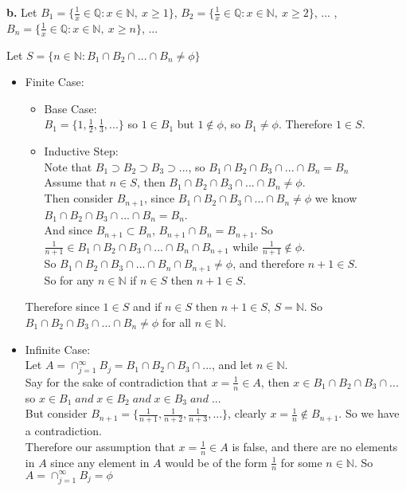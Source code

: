 \documentclass{article}
\begin{document}
{\Large \textbf{b.}} Let $B_1 = \{\frac{1}{x}\in \mathbb{Q}: x\in \mathbb{N},\: x\geq 1\}$, $B_2 = \{\frac{1}{x}\in \mathbb{Q}: x\in \mathbb{N},\: x\geq 2\}$, ... , $B_n = \{\frac{1}{x}\in \mathbb{Q}: x\in \mathbb{N},\: x\geq n\}$, ...
\begin{center}
    \doublespacing
    Let $S = \{n\in \mathbb{N}: B_1\cap B_2\cap ...\cap B_n \neq \phi \}$
    \begin{itemize}
        \item Finite Case:
        \begin{itemize}
            \item Base Case:
            \\$B_1 = \{1, \frac{1}{2}, \frac{1}{3}, ...\}$ so $1\in B_1$ but $1\notin \phi$, so $B_1 \neq \phi$. Therefore $1\in S$.
            \item Inductive Step:
            \\Note that $B_1\supset B_2\supset B_3\supset ...$, so $B_1\cap B_2\cap B_3\cap ...\cap B_n = B_n$
            \\Assume that $n\in S$, then $B_1\cap B_2\cap B_3\cap ...\cap B_n \neq \phi$.
            \\Then consider $B_{n+1}$, since $B_1\cap B_2\cap B_3\cap ...\cap B_n \neq \phi$ we know $B_1\cap B_2\cap B_3\cap ...\cap B_n = B_n$.
            \\And since $B_{n+1}\subset B_n$, $B_{n+1}\cap B_n = B_{n+1}$. So $\frac{1}{n+1}\in B_1\cap B_2\cap B_3\cap ...\cap B_n\cap B_{n+1}$ while $\frac{1}{n+1}\notin \phi$.
            \\So $B_1\cap B_2\cap B_3\cap ...\cap B_n\cap B_{n+1}\neq \phi$, and therefore $n+1\in S$.
            \\So for any $n\in \mathbb{N}$ if $n\in S$ then $n+1\in S$.
        \end{itemize}
        Therefore since $1\in S$ and if $n\in S$ then $n+1\in S$, $S = \mathbb{N}$. So $B_1\cap B_2\cap B_3\cap ...\cap B_n \neq \phi$ for all $n\in \mathbb{N}$. \qedsymbol
        \item Infinite Case:
        \\Let $A = \cap _{j=1}^{\infty} B_j = B_1\cap B_2\cap B_3\cap ...$, and let $n\in \mathbb{N}$.
        \\Say for the sake of contradiction that $x = \frac{1}{n}\in A$, then $x\in B_1\cap B_2\cap B_3\cap ...$ so $x\in B_1 \;and\; x\in B_2 \;and\; x\in B_3 \;and\; ...$
        \\But consider $B_{n+1} = \{\frac{1}{n+1}, \frac{1}{n+2}, \frac{1}{n+3}, ...\}$, clearly $x = \frac{1}{n}\notin B_{n+1}$. So we have a contradiction.
        \\Therefore our assumption that $x = \frac{1}{n}\in A$ is false, and there are no elements in $A$ since any element in $A$ would be of the form $\frac{1}{n}$ for some $n\in \mathbb{N}$. So $A = \cap _{j=1}^{\infty} B_j = \phi$ \qedsymbol
    \end{itemize}
\end{center}
\end{document}
